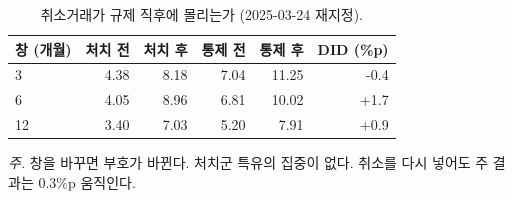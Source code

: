\begin{table}[htbp]
  \centering
  \caption{취소거래가 규제 직후에 몰리는가 (2025-03-24 재지정).}
  \label{tab:cancel}
  \begin{tabular}{lrrrrr}
    \toprule
    \textbf{창 (개월)} & \textbf{처치 전} & \textbf{처치 후} & \textbf{통제 전} & \textbf{통제 후} & \textbf{DID (\%p)} \\
    \midrule
    3 & 4.38 & 8.18 & 7.04 & 11.25 & -0.4 \\
    6 & 4.05 & 8.96 & 6.81 & 10.02 & +1.7 \\
    12 & 3.40 & 7.03 & 5.20 & 7.91 & +0.9 \\
    \bottomrule
  \end{tabular}

  \begin{minipage}{\linewidth}\footnotesize
  \textit{주.} 창을 바꾸면 부호가 바뀐다. 처치군 특유의 집중이 없다. 취소를 다시 넣어도 주 결과는 $0.3\%$p 움직인다.
  \end{minipage}
\end{table}
